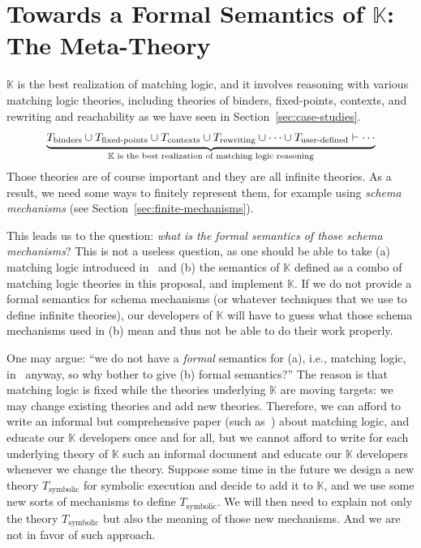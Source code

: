 \documentclass[UTF8,11pt]{article}
\theoremstyle{plain}
\theoremstyle{definition}
\theoremstyle{remark}
\newcommand{\K}{\mbox{$\mathbb{K}$}\xspace}
\begin{document}
\section{Towards a Formal Semantics of {\K}: The Meta-Theory}
\label{sec:meta-theory-reflection}

{\K} is the best realization of matching logic, and it involves reasoning with 
various matching logic theories, including theories of binders, 
fixed-points, contexts, and rewriting and reachability as we have seen in 
Section~\ref{sec:case-studies}.
$$
\underbrace{T_\textrm{binders} \cup
T_\textrm{fixed-points} \cup 
T_\textrm{contexts} \cup 
T_\textrm{rewriting} \cup 
\cdots \cup 
T_\textrm{user-defined} \vdash \cdots}_
\text{\K is the best realization of matching logic reasoning}
$$
Those theories are of course important and they are all infinite theories.
As a result, we need some ways to finitely represent them, for example using 
\emph{schema mechanisms} (see Section~\ref{sec:finite-mechanisms}).

This leads us to the question:
\emph{what is the formal semantics of those schema mechanisms}?
This is not a useless question, as one should be able to take (a) matching 
logic introduced in~\cite{rosu-2017-lmcs} and (b) the semantics of \K defined 
as a combo of matching logic theories in this proposal, and implement \K.
If we do not provide a formal semantics for schema mechanisms (or whatever 
techniques that we use to define infinite theories), our developers of \K will 
have to guess what those schema mechanisms used in (b) mean and thus not be 
able to do their work properly.

One may argue: ``we do not have a \emph{formal} semantics for (a), i.e., 
matching 
logic, in~\cite{rosu-2017-lmcs} anyway, so why bother to give (b) formal 
semantics?''
The reason is that matching logic is fixed while the theories underlying \K are 
moving targets: 
we may change existing theories and add new theories.
Therefore, we can afford to write an informal but comprehensive paper (such 
as~\cite{rosu-2017-lmcs}) about matching logic, and educate our \K developers 
once and for all, but we 
cannot afford to write for each underlying theory of \K such an informal 
document and educate our \K developers whenever we change the theory.
Suppose some time in the future we design a new theory $T_\textrm{symbolic}$ 
for symbolic execution and decide to add it to \K, and we
use some new sorts of mechanisms to define $T_\textrm{symbolic}$.
We will then need to explain not only the theory $T_\textrm{symbolic}$ but also 
the meaning of those new mechanisms.
And we are not in favor of such approach.
\end{document}
